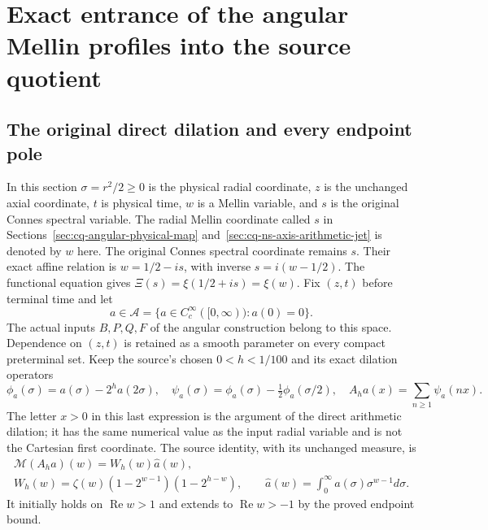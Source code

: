 \section{Exact entrance of the angular Mellin profiles into the source quotient}
\label{sec:cq-angular-ingress}

\subsection{The original direct dilation and every endpoint pole}

In this section $\sigma=r^2/2\geq0$ is the physical radial coordinate,
$z$ is the unchanged axial coordinate, $t$ is physical time, $w$ is a
Mellin variable, and $s$ is the original Connes spectral variable.
The radial Mellin coordinate called $s$ in Sections~\ref{sec:cq-angular-physical-map} and~\ref{sec:cq-ns-axis-arithmetic-jet} is denoted by $w$ here. The original Connes spectral coordinate remains $s$. Their exact affine relation is $w=1/2-is$, with inverse $s=i(w-1/2)$. The functional equation gives $\Xi(s)=\xi(1/2+is)=\xi(w)$.
Fix $(z,t)$ before terminal time and let
\[
 a\in\mathscr A=\{a\in C_c^\infty([0,\infty)):a(0)=0\}.
\]
The actual inputs $B,P,Q,F$ of the angular construction belong to
this space. Dependence on $(z,t)$ is retained as a smooth parameter
on every compact preterminal set. Keep the source's chosen
$0<h<1/100$ and its exact dilation operators
\[
 \phi_a(\sigma)=a(\sigma)-2^ha(2\sigma),\quad
 \psi_a(\sigma)=\phi_a(\sigma)-\tfrac12\phi_a(\sigma/2),\quad
 A_ha(x)=\sum_{n\geq1}\psi_a(nx).
\]
The letter $x>0$ in this last expression is the argument of the
direct arithmetic dilation; it has the same numerical value as
the input radial variable and is not the Cartesian first coordinate.
The source identity, with its unchanged measure, is
\begin{equation}
 \begin{gathered}
 \mathcal M(A_ha)(w)=W_h(w)\widehat a(w),\\
 W_h(w)=\zeta(w)(1-2^{w-1})(1-2^{h-w}),\qquad
 \widehat a(w)=\int_0^\infty a(\sigma)\sigma^{w-1}d\sigma .
 \end{gathered}
 \label{eq:cq-angular-direct-Mellin}
\end{equation}
It initially holds on $\operatorname{Re}w>1$ and extends to
$\operatorname{Re}w>-1$ by the proved endpoint bound.

